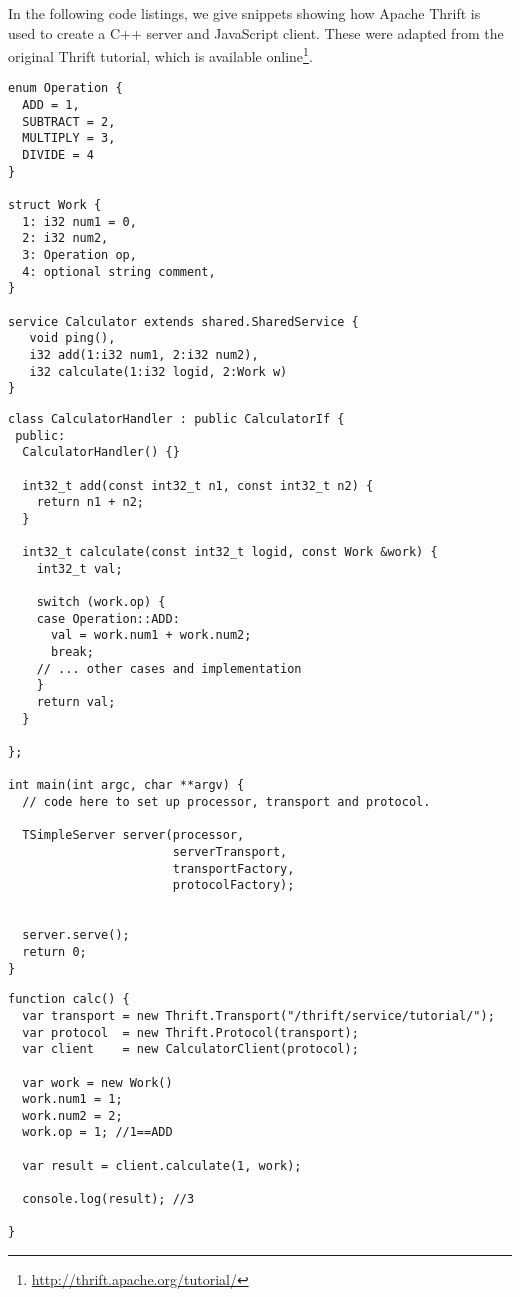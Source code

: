 In the following code listings, we give snippets showing how Apache Thrift is used to create a C++ server and JavaScript client. These were adapted from the original Thrift tutorial, which is available online\footnote{\url{http://thrift.apache.org/tutorial/}}.

\begin{lstlisting}
enum Operation {
  ADD = 1,
  SUBTRACT = 2,
  MULTIPLY = 3,
  DIVIDE = 4
}

struct Work {
  1: i32 num1 = 0,
  2: i32 num2,
  3: Operation op,
  4: optional string comment,
}

service Calculator extends shared.SharedService {
   void ping(),
   i32 add(1:i32 num1, 2:i32 num2),
   i32 calculate(1:i32 logid, 2:Work w)
}
\end{lstlisting}

\begin{lstlisting}
class CalculatorHandler : public CalculatorIf {
 public:
  CalculatorHandler() {}

  int32_t add(const int32_t n1, const int32_t n2) {
    return n1 + n2;
  }

  int32_t calculate(const int32_t logid, const Work &work) {
    int32_t val;

    switch (work.op) {
    case Operation::ADD:
      val = work.num1 + work.num2;
      break;
    // ... other cases and implementation
    }
    return val;
  }

};

int main(int argc, char **argv) {
  // code here to set up processor, transport and protocol.

  TSimpleServer server(processor,
                       serverTransport,
                       transportFactory,
                       protocolFactory);


  server.serve();
  return 0;
}
\end{lstlisting}


\begin{lstlisting}
function calc() {
  var transport = new Thrift.Transport("/thrift/service/tutorial/");
  var protocol  = new Thrift.Protocol(transport);
  var client    = new CalculatorClient(protocol);

  var work = new Work()
  work.num1 = 1;
  work.num2 = 2;
  work.op = 1; //1==ADD

  var result = client.calculate(1, work);

  console.log(result); //3
  
}
\end{lstlisting}


